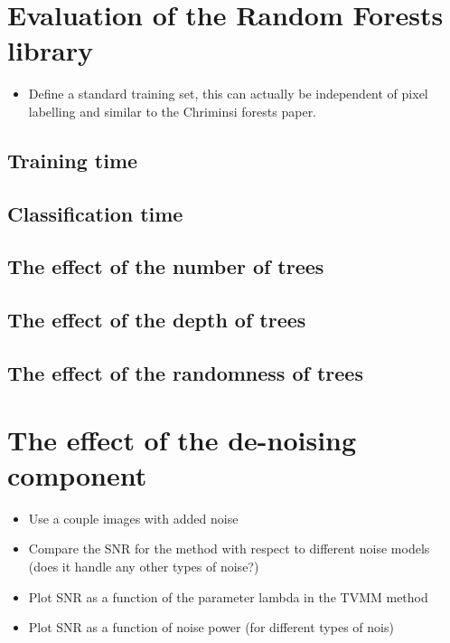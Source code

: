 \documentclass[12pt,twoside,notitlepage]{report}
\begin{document}
    \section{Evaluation of the Random Forests library}
        \begin{itemize}
            \item Define a standard training set, this can actually be independent of pixel labelling and similar to the Chriminsi forests paper.
        \end{itemize}

        \subsection{Training time}
        \subsection{Classification time}
        \subsection{The effect of the number of trees}
        \subsection{The effect of the depth of trees}
        \subsection{The effect of the randomness of trees}


    \section{The effect of the de-noising component}
        \begin{itemize}
            \item Use a couple images with added noise
            \item Compare the SNR for the method with respect to different noise models (does it handle any other types of noise?)
            \item Plot SNR as a function of the parameter lambda in the TVMM method
            \item Plot SNR as a function of noise power (for different types of nois)
        \end{itemize}


\end{document}

